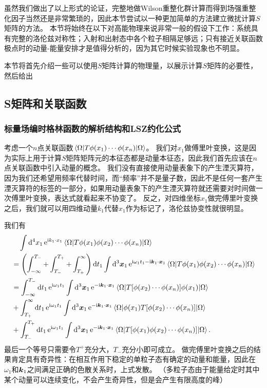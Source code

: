 \documentclass[hyperref, UTF8, a4paper]{ctexart}
\newcommand*{\ii}{\mathrm{i}}
\newcommand*{\ee}{\mathrm{e}}
\begin{document}
虽然我们做出了以上形式的论证，完整地做Wilson重整化群计算而得到场强重整化因子当然还是非常繁琐的，因此本节尝试以一种更加简单的方法建立微扰计算$S$矩阵的方法。
本节将始终在以下对高能物理来说非常一般的假设下工作：系统具有完整的洛伦兹对称性；入射和出射态中各个粒子相隔足够远；只有接近关联函数极点时的动量-能量安排才是值得分析的，因为其它时候实验现象也不明显。

本节将首先介绍一些可以使用$S$矩阵计算的物理量，以展示计算$S$矩阵的必要性，然后给出

\subsection{S矩阵和关联函数}

\subsubsection{标量场编时格林函数的解析结构和LSZ约化公式}

考虑一个$n$点关联函数$\mel{\Omega}{T \phi(x_1) \cdots \phi(x_n)}{\Omega}$。
我们对$x_1$做傅里叶变换，这是因为实际上用于计算$S$矩阵矩阵元的本征态都是动量本征态，因此我们首先应该在$n$点关联函数中引入动量的概念。
我们没有直接使用动量表象下的产生湮灭算符，因为我们还希望用频率代替时间，而“频率”并不是量子数，因此不是任何一套产生湮灭算符的标签的一部分，如果用动量表象下的产生湮灭算符就还需要对时间做一次傅里叶变换，表达式就看起来不协变了。
反之，对四维坐标$x_1$做完傅里叶变换之后，我们就可以用四维动量$k_1$代替$x_1$作为标记了，洛伦兹协变性就很明显。

我们有
\begin{equation}
    \begin{aligned}
        &\quad \int \dd[4]{x_1} \ee^{\ii k_1 \cdot x_1} \mel{\Omega}{T \phi(x_1) \phi(x_2) \cdots \phi(x_n)}{\Omega} \\
        &= \left( \int_{-\infty}^{T_-} + \int_{T_-}^{T_+} + \int_{T_+}^\infty \right) \dd{t_1} \int \dd[3]{\vb*{x}_1} \ee^{\ii \omega_1 t_1 - \ii \vb*{k}_1 \cdot \vb*{x}_1} \mel{\Omega}{T \phi(x_1) \phi(x_2) \cdots \phi(x_n)}{\Omega} \\
        &= \int_{-\infty}^{T_-} \dd{t_1} \ee^{\ii \omega_1 t_1} \int \dd[3]{\vb*{x}_1} \ee^{- \ii \vb*{k}_1 \cdot \vb*{x}_1} \mel{\Omega}{T [\phi(x_2) \cdots \phi(x_n)] \phi(x_1)}{\Omega} \\
        &+ \int_{T_+}^{\infty} \dd{t_1} \ee^{\ii \omega_1 t_1} \int \dd[3]{\vb*{x}_1} \ee^{- \ii \vb*{k}_1 \cdot \vb*{x}_1} \mel{\Omega}{\phi(x_1) T [\phi(x_2) \cdots \phi(x_n)]}{\Omega} \\
        &+ \int_{T_-}^{T_+} \dd{t_1} \ee^{\ii \omega_1 t_1} \int \dd[3]{\vb*{x}_1} \ee^{- \ii \vb*{k}_1 \cdot \vb*{x}_1} \mel{\Omega}{T [\phi(x_1) \phi(x_2) \cdots \phi(x_n)]}{\Omega}.
    \end{aligned}
    \label{eq:correlation-after-fourier}
\end{equation}
最后一个等号只需要令$T^+$充分大，$T_-$充分小即可成立。
做完傅里叶变换之后的结果肯定具有奇异性：在相互作用下稳定的单粒子态有确定的动量和能量，因此在$\omega_1$和$\vb*{k}_1$之间满足正确的色散关系时，上式发散。
（多粒子态由于能量给定时其中某个动量可以连续变化，不会产生奇异性，但是会产生有限高度的峰）
\end{document}
